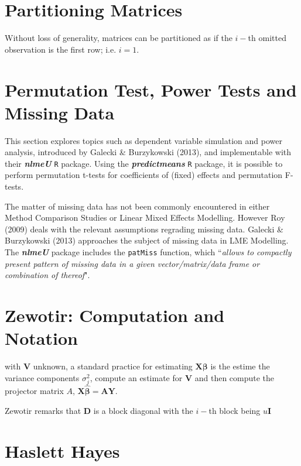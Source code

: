 \documentclass[12pt, a4paper]{report}
\theoremstyle{plain}
\theoremstyle{definition}
\theoremstyle{remark}
\begin{document}

\section{Partitioning Matrices} %
Without loss of generality, matrices can be partitioned as if the $i-$th omitted observation is the first row; i.e. $i=1$.


\section{Permutation Test, Power Tests and Missing Data }

This section explores topics such as dependent variable simulation and power analysis, introduced by Galecki \& Burzykowski (2013), and implementable with their \textbf{\textit{nlmeU}} \texttt{R} package.
Using the \textbf{\textit{predictmeans}} \texttt{R} package, it is possible to perform permutation t-tests for coefficients of (fixed) effects and permutation F-tests.

The matter of missing data has not been commonly encountered in either Method Comparison Studies or Linear Mixed Effects Modelling. However Roy (2009) deals with the relevant assumptions regrading missing data. Galecki \& Burzykowski (2013) approaches the subject of missing data in LME Modelling. The \textbf{\textit{nlmeU}} package includes the \texttt{patMiss} function, which ``\textit{allows to compactly present pattern of missing data in a given vector/matrix/data
	frame or combination of thereof}".





	\section{Zewotir: Computation and Notation } %
	with $\boldsymbol{V}$ unknown, a standard practice for estimating $\boldsymbol{X \beta}$ is the estime the variance components $\sigma^2_j$,
	compute an estimate for $\boldsymbol{V}$ and then compute the projector matrix $A$, $\boldsymbol{X \hat{\beta}}  = \boldsymbol{AY}$.
	
	
	Zewotir remarks that $\boldsymbol{D}$ is a block diagonal with the $i-$th block being $u \boldsymbol{I}$
	\section{Haslett Hayes}                %
	
\end{document}
